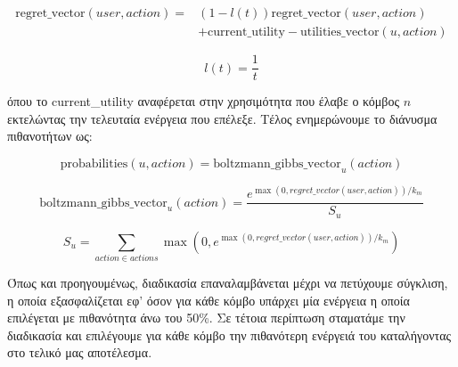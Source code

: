 \vspace{-5pt}

\begin{equation}
\begin{split}
    \text{regret\_vector}(user, action) =& \left(1 - l(t)\right) \text{regret\_vector}(user, action)\\
    &+ \text{current\_utility} - \text{utilities\_vector}(u,action)
\end{split}
\label{eq30}
\end{equation}

\vspace{-3pt}

\[l(t) = \frac{1}{t}\]

όπου το current\_utility αναφέρεται στην χρησιμότητα που έλαβε ο κόμβος $n$ εκτελώντας την τελευταία ενέργεια που επέλεξε. Τέλος ενημερώνουμε το διάνυσμα πιθανοτήτων ως:

\vspace{-5pt}

\begin{equation}
    \text{probabilities}(u,action) = \text{boltzmann\_gibbs\_vector}_u(action)
\label{eq31}
\end{equation}

\vspace{-3pt}

\[
\text{boltzmann\_gibbs\_vector}_u(action) = \frac{e^{\max(0, regret\_vector(user, action))/k_m}}{S_u}
\]

\[S_u = \sum_{action \in actions} \max(0, e^{\max(0, regret\_vector(user, action))/k_m})\]

Όπως και προηγουμένως, διαδικασία επαναλαμβάνεται μέχρι να πετύχουμε σύγκλιση, η οποία εξασφαλίζεται εφ' όσον για κάθε κόμβο υπάρχει μία ενέργεια η οποία επιλέγεται με πιθανότητα άνω του 50\%. Σε τέτοια περίπτωση σταματάμε την διαδικασία και επιλέγουμε για κάθε κόμβο την πιθανότερη ενέργειά του καταλήγοντας στο τελικό μας αποτέλεσμα.


